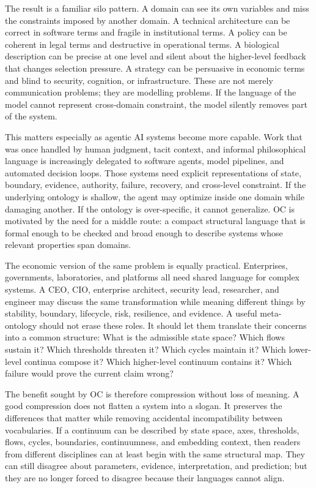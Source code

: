 The result is a familiar silo pattern. A domain can see its own variables and
miss the constraints imposed by another domain. A technical architecture can be
correct in software terms and fragile in institutional terms. A policy can be
coherent in legal terms and destructive in operational terms. A biological
description can be precise at one level and silent about the higher-level
feedback that changes selection pressure. A strategy can be persuasive in
economic terms and blind to security, cognition, or infrastructure. These are
not merely communication problems; they are modelling problems. If the language
of the model cannot represent cross-domain constraint, the model silently
removes part of the system.

This matters especially as agentic AI systems become more capable. Work that
was once handled by human judgment, tacit context, and informal philosophical
language is increasingly delegated to software agents, model pipelines, and
automated decision loops. Those systems need explicit representations of
state, boundary, evidence, authority, failure, recovery, and cross-level
constraint. If the underlying ontology is shallow, the agent may optimize inside
one domain while damaging another. If the ontology is over-specific, it cannot
generalize. OC is motivated by the need for a middle route: a compact structural
language that is formal enough to be checked and broad enough to describe
systems whose relevant properties span domains.

The economic version of the same problem is equally practical. Enterprises,
governments, laboratories, and platforms all need shared language for complex
systems. A CEO, CIO, enterprise architect, security lead, researcher, and
engineer may discuss the same transformation while meaning different things by
stability, boundary, lifecycle, risk, resilience, and evidence. A useful
meta-ontology should not erase these roles. It should let them translate their
concerns into a common structure: What is the admissible state space? Which
flows sustain it? Which thresholds threaten it? Which cycles maintain it? Which
lower-level continua compose it? Which higher-level continuum contains it?
Which failure would prove the current claim wrong?

The benefit sought by OC is therefore compression without loss of meaning. A
good compression does not flatten a system into a slogan. It preserves the
differences that matter while removing accidental incompatibility between
vocabularies. If a continuum can be described by state space, axes, thresholds,
flows, cycles, boundaries, continuumness, and embedding context, then readers
from different disciplines can at least begin with the same structural map.
They can still disagree about parameters, evidence, interpretation, and
prediction; but they are no longer forced to disagree because their languages
cannot align.

